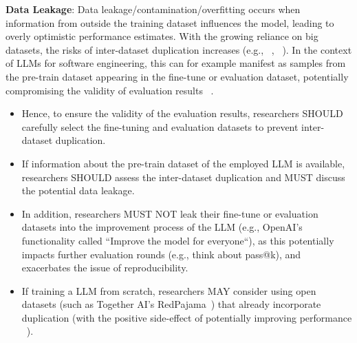 \textbf{Data Leakage}:
Data leakage/contamination/overfitting occurs when information from outside the training dataset influences the model, leading to overly optimistic performance estimates. With the growing reliance on big datasets, the risks of inter-dataset duplication increases (e.g., ~\cite{DBLP:journals/pacmpl/LopesMMSYZSV17}, ~\cite{DBLP:conf/oopsla/Allamanis19}). 
In the context of LLMs for software engineering, this can for example manifest as samples from the pre-train dataset appearing in the fine-tune or evaluation dataset, potentially compromising the validity of evaluation results ~\cite{DBLP:journals/tse/LopezCSSV25}. 
\begin{itemize}
  \item Hence, to ensure the validity of the evaluation results, researchers SHOULD carefully select the fine-tuning and evaluation datasets to prevent inter-dataset duplication. 
  \item If information about the pre-train dataset of the employed LLM is available, researchers SHOULD assess the inter-dataset duplication and MUST discuss the potential data leakage.
  \item In addition, researchers MUST NOT leak their fine-tune or evaluation datasets into the improvement process of the LLM (e.g., OpenAI's functionality called ``Improve the model for everyone``), as this potentially impacts further evaluation rounds (e.g., think about pass@k), and exacerbates the issue of reproducibility.
  \item If training a LLM from scratch, researchers MAY consider using open datasets (such as Together AI's RedPajama~\cite{together2023redpajama}) that already incorporate duplication (with the positive side-effect of potentially improving performance ~\cite{DBLP:conf/acl/LeeINZECC22}).
\end{itemize}


